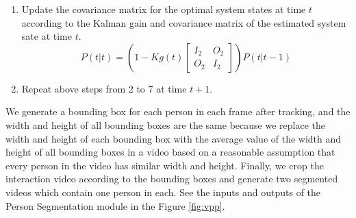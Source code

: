 \begin{enumerate}
	\item Update the covariance matrix for the optimal system states at time \(t\) according to the Kalman gain and covariance matrix of the estimated system sate at time \(t\). 
	\begin{equation}
	P(t|t) = \left(1-Kg(t)\begin{bmatrix}
	I_2&O_2 \\
	O_2&I_2
	\end{bmatrix}\right)P(t|t-1)
	\end{equation}
	
	\item Repeat above steps from 2 to 7 at time \(t+1\).
\end{enumerate}

We generate a bounding box for each person in each frame after tracking, and the width and height of all bounding boxes are the same because we replace the width and height of each bounding box with the average value of the width and height of all bounding boxes in a video based on a reasonable assumption that every person in the video has similar width and height. Finally, we crop the interaction video according to the bounding boxes and generate two segmented videos which contain one person in each. See the inputs and outputs of the Person Segmentation module in the Figure \ref{fig:vpp}.

